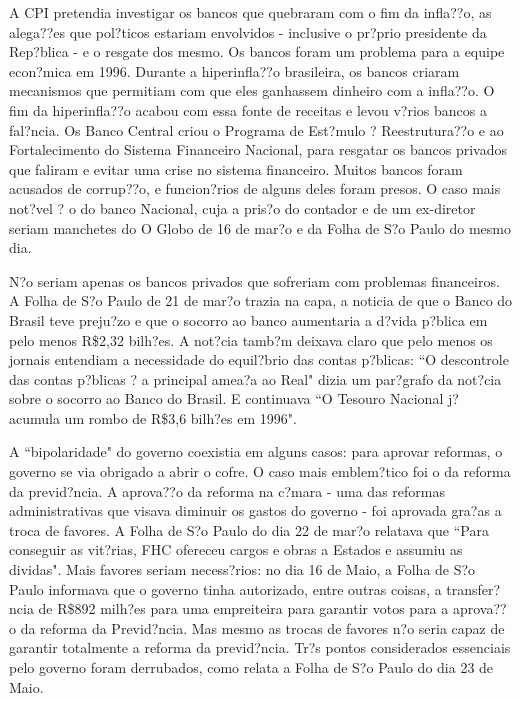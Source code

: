\documentclass{article}
\begin{document}
A CPI pretendia investigar os bancos que quebraram com o fim da infla??o, as alega??es que pol?ticos estariam envolvidos - inclusive o pr?prio presidente da Rep?blica - e o resgate dos mesmo. Os bancos foram um problema para a equipe econ?mica em 1996. Durante a hiperinfla??o brasileira, os bancos criaram mecanismos que permitiam com que eles ganhassem dinheiro com a infla??o. O fim da hiperinfla??o acabou com essa fonte de receitas e levou v?rios bancos a fal?ncia. Os Banco Central criou o Programa de Est?mulo ? Reestrutura??o e ao Fortalecimento do Sistema Financeiro Nacional, para resgatar os bancos privados que faliram e evitar uma crise no sistema financeiro. Muitos bancos foram acusados de corrup??o, e funcion?rios de alguns deles foram presos. O caso mais not?vel ? o do banco Nacional, cuja a pris?o do contador e de um ex-diretor seriam manchetes do O Globo de 16 de mar?o e da Folha de S?o Paulo do mesmo dia.

N?o seriam apenas os bancos privados que sofreriam com problemas financeiros. A Folha de S?o Paulo de 21 de mar?o trazia na capa, a noticia de que o Banco do Brasil teve preju?zo e que o socorro ao banco aumentaria a d?vida p?blica em pelo menos R\$2,32 bilh?es. A not?cia tamb?m deixava claro que pelo menos os jornais entendiam a necessidade do equil?brio das contas p?blicas: ``O descontrole das contas p?blicas ? a principal amea?a ao Real" dizia um par?grafo da not?cia sobre o socorro ao Banco do Brasil. E continuava ``O Tesouro Nacional j? acumula um rombo de R\$3,6 bilh?es em 1996". 

A ``bipolaridade" do governo coexistia em alguns casos: para aprovar reformas, o governo se via obrigado a abrir o cofre. O caso mais emblem?tico foi o da reforma da previd?ncia. A aprova??o da reforma na c?mara - uma das reformas administrativas que visava diminuir os gastos do governo - foi aprovada gra?as a troca de favores. A Folha de S?o Paulo do dia 22 de mar?o relatava que ``Para conseguir as vit?rias, FHC ofereceu cargos e obras a Estados e assumiu as dividas". Mais favores seriam necess?rios: no dia 16 de Maio, a Folha de S?o Paulo informava que o governo tinha autorizado, entre outras coisas, a transfer?ncia de R\$892 milh?es para uma empreiteira para garantir votos para a aprova??o da reforma da Previd?ncia. Mas mesmo as trocas de favores n?o seria capaz de garantir totalmente a reforma da previd?ncia. Tr?s pontos considerados essenciais pelo governo foram derrubados, como relata a Folha de S?o Paulo do dia 23 de Maio.
\end{document}

